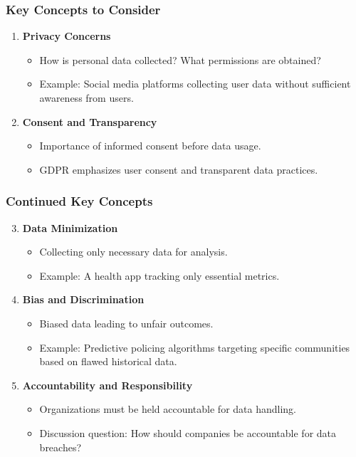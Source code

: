 \documentclass[aspectratio=169]{beamer}
\begin{document}
\begin{frame}[fragile]
    \frametitle{Key Concepts to Consider}
    \begin{enumerate}
        \item \textbf{Privacy Concerns}
            \begin{itemize}
                \item How is personal data collected? What permissions are obtained?
                \item Example: Social media platforms collecting user data without sufficient awareness from users.
            \end{itemize}
        \item \textbf{Consent and Transparency}
            \begin{itemize}
                \item Importance of informed consent before data usage.
                \item GDPR emphasizes user consent and transparent data practices.
            \end{itemize}
    \end{enumerate}
\end{frame}

\begin{frame}[fragile]
    \frametitle{Continued Key Concepts}
    \begin{enumerate}
        \setcounter{enumi}{2}
        \item \textbf{Data Minimization}
            \begin{itemize}
                \item Collecting only necessary data for analysis.
                \item Example: A health app tracking only essential metrics.
            \end{itemize}
        \item \textbf{Bias and Discrimination}
            \begin{itemize}
                \item Biased data leading to unfair outcomes.
                \item Example: Predictive policing algorithms targeting specific communities based on flawed historical data.
            \end{itemize}
        \item \textbf{Accountability and Responsibility}
            \begin{itemize}
                \item Organizations must be held accountable for data handling.
                \item Discussion question: How should companies be accountable for data breaches?
            \end{itemize}
    \end{enumerate}
\end{frame}
\end{document}
